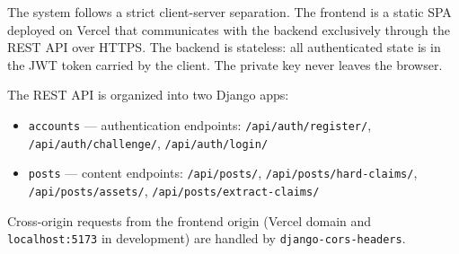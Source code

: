\documentclass[a4paper,12pt]{report}
\begin{document}
The system follows a strict client-server separation. The frontend is a static SPA deployed on Vercel that communicates with the backend exclusively through the REST API over HTTPS. The backend is stateless: all authenticated state is in the JWT token carried by the client. The private key never leaves the browser.

The REST API is organized into two Django apps:
\begin{sloppypar}
\begin{itemize}
    \item \texttt{accounts} --- authentication endpoints: \texttt{/api/auth/register/}, \texttt{/api/auth/challenge/}, \texttt{/api/auth/login/}
    \item \texttt{posts} --- content endpoints: \texttt{/api/posts/}, \texttt{/api/posts/hard-claims/}, \texttt{/api/posts/assets/}, \texttt{/api/posts/extract-claims/}
\end{itemize}
\end{sloppypar}

\begin{sloppypar}
Cross-origin requests from the frontend origin (Vercel domain and \texttt{localhost:5173} in development) are handled by \texttt{django-cors-headers}.
\end{sloppypar}
\end{document}
